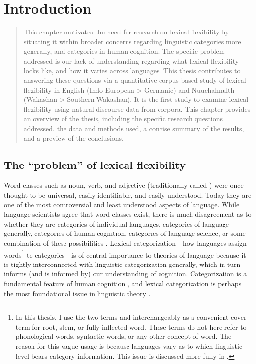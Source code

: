 \chapter{Introduction}
\label{ch:introduction}

\blockquote{This chapter motivates the need for research on lexical flexibility by situating it within broader concerns regarding linguistic categories more generally, and categories in human cognition. The specific problem addressed is our lack of understanding regarding what lexical flexibility looks like, and how it varies across languages. This thesis contributes to answering these questions via a quantitative corpus-based study of lexical flexibility in English (Indo-European > Germanic) and Nuuchahnulth (Wakashan > Southern Wakashan). It is the first study to examine lexical flexibility using natural discourse data from corpora. This chapter provides an overview of the thesis, including the specific research questions addressed, the data and methods used, a concise summary of the results, and a preview of the conclusions.}

\section{The \enquote{problem} of lexical flexibility}
\label{sec:1.1}

Word classes such as noun, verb, and adjective (traditionally called ) were once thought to be universal, easily identifiable, and easily understood. Today they are one of the most controversial and least understood aspects of language. While language scientists agree that word classes exist, there is much disagreement as to whether they are categories of individual languages, categories of language generally, categories of human cognition, categories of language science, or some combination of these possibilities \parencites[166]{Mithun2017}{Haspelmath2018}{Hieberfc}. Lexical categorization—how languages assign words\footnote{In this thesis, I use the two terms  and  interchangeably as a convenient cover term for root, stem, or fully inflected word. These terms do not here refer to phonological words, syntactic words, or any other concept of word. The reason for this vague usage is because languages vary as to which linguistic level bears category information. This issue is discussed more fully in .} to categories—is of central importance to theories of language because it is tightly interconnected with linguistic categorization generally, which in turn informs (and is informed by) our understanding of cognition. Categorization is a fundamental feature of human cognition \parencites[xi]{Taylor2003}[2--3]{LierRijkhoff2013}, and lexical categorization is perhaps the most foundational issue in linguistic theory \parencites[36]{Croft1991}[1]{VapnarskyVeneziano2017b}.

